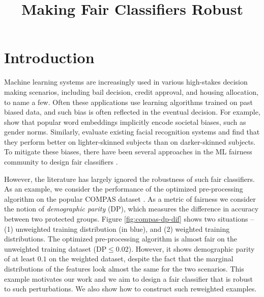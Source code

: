 \documentclass{article}
\title{Making Fair Classifiers Robust}
\newcommand{\kibitz}[2]{\ifnum\Comments=1{\color{#1}{#2}}\fi}
\newcommand{\dm}[1]{\kibitz{magenta}{[Deb: #1]}}
\begin{document}
\maketitle


\section{Introduction}
Machine learning systems are increasingly used in various high-stakes decision making scenarios, including bail decision, credit approval, and housing allocation, to name a few. Often these applications use learning algorithms trained on past biased data, and such bias is often reflected in the eventual decision. For example, \cite{BCZS+16} show that popular word embeddings implicitly encode societal biases, such as gender norms. Similarly, \cite{BG18} evaluate existing facial recognition systems and find that they perform better on lighter-skinned subjects  than on darker-skinned subjects. To mitigate these biases, there have been several approaches in the ML fairness community to design fair classifiers \cite{ZWSP+13,HPS16,ABDL+18}. 

However, the literature has largely ignored the robustness of such fair classifiers. As an example, we consider the performance of the optimized pre-processing algorithm \cite{CWVN+17} on the popular COMPAS dataset \cite{COMPAS}. As a metric of fairness we consider the notion of \emph{demographic parity} (DP), which measures the difference in accuracy between two protected groups. Figure \ref{fig:compas-dp-dif} shows two situations -- (1) unweighted training distribution (in blue), and (2) weighted training distributions. The optimized pre-processing algorithm \cite{CWVN+17} is almost fair on the unweighted training dataset ($\textrm{DP} \leq 0.02$). However, it shows demographic parity of at least $0.1$ on the weighted dataset, despite the fact that the marginal distributions of the features look almost the same for the two scenarios. This example motivates our work and we aim to design a fair classifier that is robust to such perturbations. We also show how to construct such reweighted examples.
\end{document}
